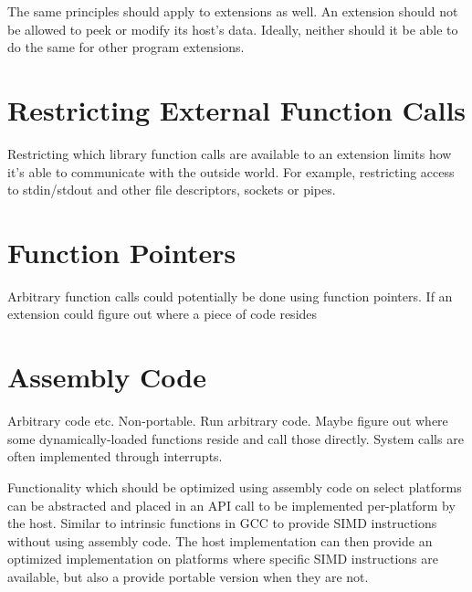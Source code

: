 The same principles should apply to extensions as well. An extension should not
be allowed to peek or modify its host's data. Ideally, neither should it be
able to do the same for other program extensions.

\section {Restricting External Function Calls}

Restricting which library function calls are available to an extension limits
how it's able to communicate with the outside world. For example, restricting
access to stdin/stdout and other file descriptors, sockets or pipes.

\section {Function Pointers}

Arbitrary function calls could potentially be done using function pointers. If
an extension could figure out where a piece of code resides

\section {Assembly Code}

Arbitrary code etc. Non-portable. Run arbitrary code. Maybe figure out where
some dynamically-loaded functions reside and call those directly. System calls
are often implemented through interrupts. 

Functionality which should be optimized using assembly code on select platforms
can be abstracted and placed in an API call to be implemented per-platform by
the host. Similar to intrinsic functions in GCC to provide SIMD instructions
without using assembly code. The host implementation can then provide an
optimized implementation on platforms where specific SIMD instructions are
available, but also a provide portable version when they are not.

